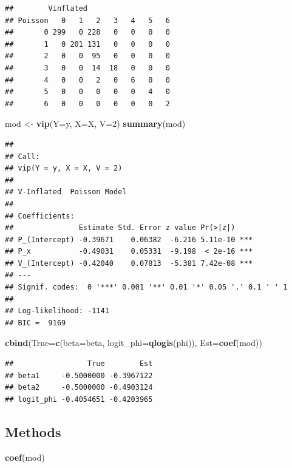 \documentclass[]{article}
\newenvironment{Shaded}{\begin{snugshade}}{\end{snugshade}}
\newcommand{\KeywordTok}[1]{\textcolor[rgb]{0.13,0.29,0.53}{\textbf{#1}}}
\newcommand{\DataTypeTok}[1]{\textcolor[rgb]{0.13,0.29,0.53}{#1}}
\newcommand{\DecValTok}[1]{\textcolor[rgb]{0.00,0.00,0.81}{#1}}
\newcommand{\StringTok}[1]{\textcolor[rgb]{0.31,0.60,0.02}{#1}}
\newcommand{\NormalTok}[1]{#1}
\begin{document}
\begin{verbatim}
##        Vinflated
## Poisson   0   1   2   3   4   5   6
##       0 299   0 228   0   0   0   0
##       1   0 201 131   0   0   0   0
##       2   0   0  95   0   0   0   0
##       3   0   0  14  18   0   0   0
##       4   0   0   2   0   6   0   0
##       5   0   0   0   0   0   4   0
##       6   0   0   0   0   0   0   2
\end{verbatim}

\begin{Shaded}
\begin{Highlighting}[]
\NormalTok{mod <-}\StringTok{ }\KeywordTok{vip}\NormalTok{(}\DataTypeTok{Y=}\NormalTok{y, }\DataTypeTok{X=}\NormalTok{X, }\DataTypeTok{V=}\DecValTok{2}\NormalTok{)}
\KeywordTok{summary}\NormalTok{(mod)}
\end{Highlighting}
\end{Shaded}

\begin{verbatim}
## 
## Call:
## vip(Y = y, X = X, V = 2)
## 
## V-Inflated  Poisson Model
## 
## Coefficients:
##               Estimate Std. Error z value Pr(>|z|)    
## P_(Intercept) -0.39671    0.06382  -6.216 5.11e-10 ***
## P_x           -0.49031    0.05331  -9.198  < 2e-16 ***
## V_(Intercept) -0.42040    0.07813  -5.381 7.42e-08 ***
## ---
## Signif. codes:  0 '***' 0.001 '**' 0.01 '*' 0.05 '.' 0.1 ' ' 1 
## 
## Log-likelihood: -1141 
## BIC =  9169
\end{verbatim}

\begin{Shaded}
\begin{Highlighting}[]
\KeywordTok{cbind}\NormalTok{(}\DataTypeTok{True=}\KeywordTok{c}\NormalTok{(}\DataTypeTok{beta=}\NormalTok{beta, }\DataTypeTok{logit_phi=}\KeywordTok{qlogis}\NormalTok{(phi)),}
      \DataTypeTok{Est=}\KeywordTok{coef}\NormalTok{(mod))}
\end{Highlighting}
\end{Shaded}

\begin{verbatim}
##                 True        Est
## beta1     -0.5000000 -0.3967122
## beta2     -0.5000000 -0.4903124
## logit_phi -0.4054651 -0.4203965
\end{verbatim}

\subsection{Methods}\label{methods}

\begin{Shaded}
\begin{Highlighting}[]
\KeywordTok{coef}\NormalTok{(mod)}
\end{Highlighting}
\end{Shaded}
\end{document}
